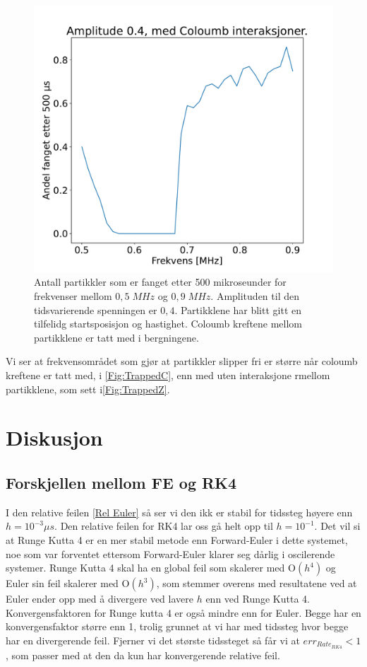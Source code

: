 \documentclass[reprint,english,notitlepage, nofootinbib]{revtex4-1}  %
\begin{document}
\begin{figure}[H]
\centering
\includegraphics[scale=0.3]{../Images/TrappedColoumb.pdf}
\caption{Antall partikkler som er fanget etter 500 mikroseunder for frekvenser mellom $0,5 \; MHz$ og $0,9 \; MHz$. Amplituden til den tidsvarierende spenningen er $0,4$. Partikklene har blitt gitt en tilfelidg startsposisjon og hastighet. Coloumb kreftene mellom partikklene er tatt med i bergningene.}
\label{Fig:TrappedC}
\end{figure}

Vi ser at frekvensområdet som gjør at partikkler slipper fri er større når coloumb kreftene er tatt med, i \autoref{Fig:TrappedC}, enn med uten interaksjone rmellom partikklene, som sett i\autoref{Fig:TrappedZ}.

\section{Diskusjon}

\subsection*{Forskjellen mellom FE og RK4}

I den relative feilen \autoref{Rel Euler} så ser vi den ikk er stabil for tidssteg høyere enn $h = 10^{-3} \mu s$. Den relative feilen for RK4 lar oss gå helt opp til $h = 10^{-1}$. Det vil si at Runge Kutta 4 er en mer stabil metode enn Forward-Euler i dette systemet, noe som var forventet ettersom Forward-Euler klarer seg dårlig i oscilerende systemer. Runge Kutta 4 skal ha en global feil som skalerer med $\mathrm{O}(h^4)$ og Euler sin feil skalerer med $\mathrm{O}(h^3)$, som stemmer overens med resultatene ved at Euler ender opp med å divergere ved lavere $h$ enn ved Runge Kutta 4. Konvergensfaktoren for Runge kutta 4 er også mindre enn for Euler. Begge har en konvergensfaktor større enn 1, trolig grunnet at vi har med tidssteg hvor begge har en divergerende feil. Fjerner vi det største tidssteget så får vi at $err_{Rate_{RK4}} < 1$, som passer med at den da kun har konvergerende relative feil.
\end{document}
